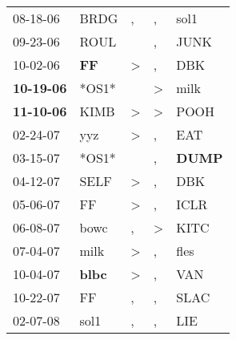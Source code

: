\begin{supertabular}{p{0.07\textwidth}p{0.06\textwidth}p{0.02\textwidth}p{0.02\textwidth}p{0.06\textwidth}}
          08-18-06\textsuperscript{} &           BRDG\textsuperscript{} &                , &                , &           sol1\textsuperscript{} \\
          09-23-06\textsuperscript{} &           ROUL\textsuperscript{} &                  &                , &           JUNK\textsuperscript{} \\
          10-02-06\textsuperscript{} &    \textbf{FF\textsuperscript{}} &     \textgreater &                , &            DBK\textsuperscript{} \\
 \textbf{10-19-06\textsuperscript{}} &                            *OS1* &                  &     \textgreater &           milk\textsuperscript{} \\
 \textbf{11-10-06\textsuperscript{}} &           KIMB\textsuperscript{} &     \textgreater &     \textgreater &           POOH\textsuperscript{} \\
          02-24-07\textsuperscript{} &            yyz\textsuperscript{} &     \textgreater &                , &            EAT\textsuperscript{} \\
          03-15-07\textsuperscript{} &                            *OS1* &                  &                , &  \textbf{DUMP\textsuperscript{}} \\
          04-12-07\textsuperscript{} &           SELF\textsuperscript{} &     \textgreater &                , &            DBK\textsuperscript{} \\
          05-06-07\textsuperscript{} &             FF\textsuperscript{} &     \textgreater &                , &           ICLR\textsuperscript{} \\
          06-08-07\textsuperscript{} &           bowc\textsuperscript{} &                , &     \textgreater &           KITC\textsuperscript{} \\
          07-04-07\textsuperscript{} &           milk\textsuperscript{} &     \textgreater &                , &           fles\textsuperscript{} \\
          10-04-07\textsuperscript{} &  \textbf{blbc\textsuperscript{}} &     \textgreater &                , &            VAN\textsuperscript{} \\
          10-22-07\textsuperscript{} &             FF\textsuperscript{} &                , &                , &           SLAC\textsuperscript{} \\
          02-07-08\textsuperscript{} &           sol1\textsuperscript{} &                , &                , &            LIE\textsuperscript{} \\

\end{supertabular}
